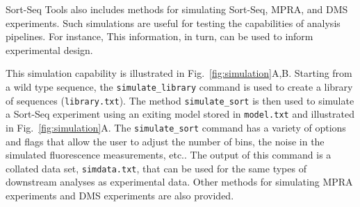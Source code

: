 \documentclass{bmcart}
\newcommand{\fig}[2]{Fig.\ \ref{#1}#2}
\newcommand{\bea}{\begin{eqnarray}}
\newcommand{\eea}{\end{eqnarray}}
\newcommand{\set}[1]{\left\{ #1 \right\}}
\begin{document}
Sort-Seq Tools also includes methods for simulating Sort-Seq, MPRA, and DMS experiments. Such simulations are useful for testing the capabilities of analysis pipelines. For instance, This information, in turn, can be used to inform experimental design. 

This simulation capability is illustrated in \fig{fig:simulation}{A,B}. Starting from a wild type sequence, the \texttt{simulate\_library} command is used to create a library of sequences (\texttt{library.txt}). The method \texttt{simulate\_sort} is then used to simulate a Sort-Seq experiment using an exiting model stored in \texttt{model.txt} and illustrated in \fig{fig:simulation}{A}. The \texttt{simulate\_sort} command has a variety of options and flags that allow the user to adjust the number of bins, the noise in the simulated fluorescence measurements, etc.. The output of this command is a collated data set, \texttt{simdata.txt}, that can be used for the same types of downstream analyses as experimental data. Other methods for simulating MPRA experiments and DMS experiments are also provided. 

%
%
\end{document}
